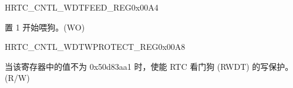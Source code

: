 \begin{register}{H}{RTC\_CNTL\_WDTFEED\_REG}{0x00A4}\label{regdesc:RTCCNTLWDTFEEDREG}
%
%
\regnewline%
\begin{regdesc}\begin{reglist}
\label{fielddesc:RTCCNTLWDTFEED}\item [RTC\_CNTL\_WDT\_FEED] 置 1 开始喂狗。(WO)
\end{reglist}\end{regdesc}
\end{register}


\begin{register}{H}{RTC\_CNTL\_WDTWPROTECT\_REG}{0x00A8}\label{regdesc:RTCCNTLWDTWPROTECTREG}
%
\regnewline%
\begin{regdesc}\begin{reglist}
\label{fielddesc:RTCCNTLWDTWKEY}\item [RTC\_CNTL\_WDT\_WKEY] 当该寄存器中的值不为 0x50d83aa1 时，使能 RTC 看门狗 (RWDT) 的写保护。(R/W)
\end{reglist}\end{regdesc}
\end{register}


